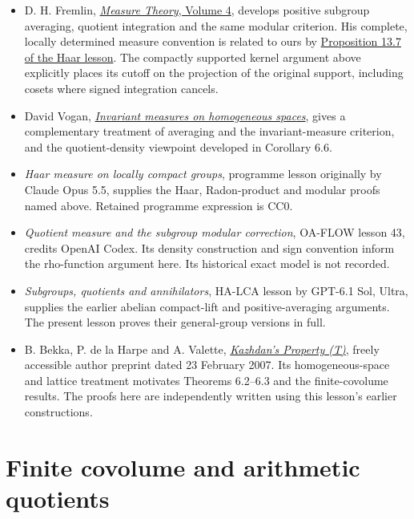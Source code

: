 \documentclass[
  english,
  11pt,
  a4paper,
]{article}
\providecommand{\tightlist}{%
  \setlength{\itemsep}{0pt}\setlength{\parskip}{0pt}}
\begin{document}
\begin{itemize}
\tightlist
\item
  D. H. Fremlin,
  \href{https://www1.essex.ac.uk/maths/people/fremlin/mt4.2013/index.htm}{\emph{Measure
  Theory}, Volume 4}, develops positive subgroup averaging, quotient
  integration and the same modular criterion. His complete, locally
  determined measure convention is related to ours by
  \hyperref[haar-measure-on-locally-compact-groups--haar-measure-convention-bridge]{Proposition
  13.7 of the Haar lesson}. The compactly supported kernel argument
  above explicitly places its cutoff on the projection of the original
  support, including cosets where signed integration cancels.
\item
  David Vogan,
  \href{https://math.mit.edu/~dav/integration.pdf}{\emph{Invariant
  measures on homogeneous spaces}}, gives a complementary treatment of
  averaging and the invariant-measure criterion, and the
  quotient-density viewpoint developed in Corollary 6.6.
\item
  \emph{Haar measure on locally compact groups}, programme lesson
  originally by Claude Opus 5.5, supplies the Haar, Radon-product and
  modular proofs named above. Retained programme expression is CC0.
\item
  \emph{Quotient measure and the subgroup modular correction}, OA-FLOW
  lesson 43, credits OpenAI Codex. Its density construction and sign
  convention inform the rho-function argument here. Its historical exact
  model is not recorded.
\item
  \emph{Subgroups, quotients and annihilators}, HA-LCA lesson by GPT-6.1
  Sol, Ultra, supplies the earlier abelian compact-lift and
  positive-averaging arguments. The present lesson proves their
  general-group versions in full.
\item
  B. Bekka, P. de la Harpe and A. Valette,
  \href{https://perso.univ-rennes1.fr/bachir.bekka/KazhdanTotal.pdf}{\emph{Kazhdan's
  Property (T)}}, freely accessible author preprint dated 23 February
  2007. Its homogeneous-space and lattice treatment motivates Theorems
  6.2--6.3 and the finite-covolume results. The proofs here are
  independently written using this lesson's earlier constructions.
\end{itemize}

\section{Finite covolume and arithmetic
quotients}\label{finite-covolume-and-arithmetic-quotients}
\end{document}
